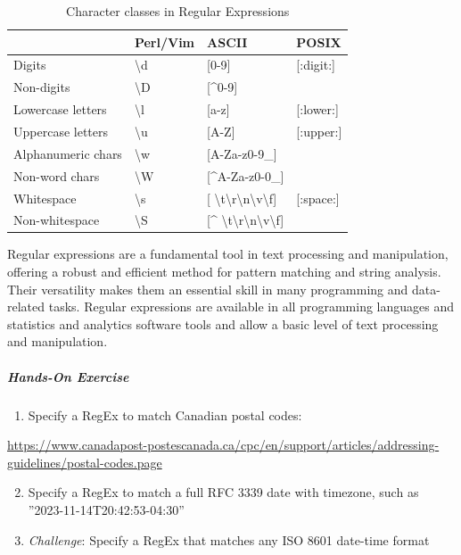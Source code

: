 \begin{table}
\small
\centering
\renewcommand{\arraystretch}{1.25}
\begin{tabular}{l|l|l|l} \hline
                  & \textbf{Perl/Vim} & \textbf{ASCII} & \textbf{POSIX} \\ \hline \hline
Digits            & \textbackslash d & [0-9]  & [:digit:]  \\
Non-digits        & \textbackslash D & [\textasciicircum 0-9] & \\
Lowercase letters & \textbackslash l & [a-z] & [:lower:] \\
Uppercase letters & \textbackslash u & [A-Z] & [:upper:] \\
Alphanumeric chars & \textbackslash w & [A-Za-z0-9\_] & \\
Non-word chars    & \textbackslash W & [\textasciicircum A-Za-z0-0\_] & \\
Whitespace        & \textbackslash s & [ \textbackslash t\textbackslash r\textbackslash n\textbackslash v\textbackslash f] & [:space:] \\
Non-whitespace    & \textbackslash S & [\textasciicircum{ } \textbackslash t\textbackslash r\textbackslash n\textbackslash v\textbackslash f] & \\ \hline
\end{tabular}
\caption{Character classes in Regular Expressions}
\label{tab:regexclasses}
\end{table}

Regular expressions are a fundamental tool in text processing and manipulation, offering a robust and efficient method for pattern matching and string analysis. Their versatility makes them an essential skill in many programming and data-related tasks. Regular expressions are available in all programming languages and statistics and analytics software tools and allow a basic level of text processing and manipulation.

\begin{tcolorbox}[colback=code]
\subparagraph*{Hands-On Exercise} 
\begin{enumerate}
	\item Specify a RegEx to match Canadian postal codes:
\end{enumerate}
\url{https://www.canadapost-postescanada.ca/cpc/en/support/articles/addressing-guidelines/postal-codes.page} 
\begin{enumerate}
	\setcounter{enumi}{1}
	\item Specify a RegEx to match a full RFC 3339 date with timezone, such as ''2023-11-14T20:42:53-04:30''
	\item \emph{Challenge}: Specify a RegEx that matches any ISO 8601 date-time format
\end{enumerate}
\end{tcolorbox}


